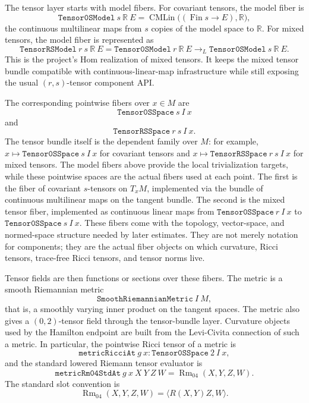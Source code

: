 \documentclass[11pt]{article}
\theoremstyle{plain}
\theoremstyle{definition}
\theoremstyle{remark}
\newcommand{\Rm}{\operatorname{Rm}}
\begin{document}
The tensor layer starts with model fibers.  For covariant tensors, the model
fiber is
\[
  \mathtt{Tensor0SModel}\ s\ \mathbb R\ E
  =
  \operatorname{CMLin}\bigl((\operatorname{Fin}s\to E),\mathbb R\bigr),
\]
the continuous multilinear maps from \(s\) copies of the model space to
\(\mathbb R\).  For mixed tensors, the model fiber is represented as
\[
  \mathtt{TensorRSModel}\ r\ s\ \mathbb R\ E
  =
  \mathtt{Tensor0SModel}\ r\ \mathbb R\ E
  \to_{\!L}
  \mathtt{Tensor0SModel}\ s\ \mathbb R\ E .
\]
This is the project's Hom realization of mixed tensors.  It keeps the mixed
tensor bundle compatible with continuous-linear-map infrastructure while still
exposing the usual \((r,s)\)-tensor component API.

The corresponding pointwise fibers over \(x\in M\) are
\[
  \mathtt{Tensor0SSpace}\ s\ I\ x
\]
and
\[
  \mathtt{TensorRSSpace}\ r\ s\ I\ x .
\]
The tensor bundle itself is the dependent family over \(M\): for example,
\(x\mapsto\mathtt{Tensor0SSpace}\ s\ I\ x\) for covariant tensors and
\(x\mapsto\mathtt{TensorRSSpace}\ r\ s\ I\ x\) for mixed tensors.  The model
fibers above provide the local trivialization targets, while these pointwise
spaces are the actual fibers used at each point.
The first is the fiber of covariant \(s\)-tensors on \(T_xM\), implemented via
the bundle of continuous multilinear maps on the tangent bundle.  The second is
the mixed tensor fiber, implemented as continuous linear maps from
\(\mathtt{Tensor0SSpace}\ r\ I\ x\) to
\(\mathtt{Tensor0SSpace}\ s\ I\ x\).  These fibers come with the topology,
vector-space, and normed-space structure needed by later estimates.  They are
not merely notation for components; they are the actual fiber objects on which
curvature, Ricci tensors, trace-free Ricci tensors, and tensor norms live.

Tensor fields are then functions or sections over these fibers.  The metric is
a smooth Riemannian metric
\[
  \mathtt{SmoothRiemannianMetric}\ I\ M,
\]
that is, a smoothly varying inner product on the tangent spaces.  The metric
also gives a \((0,2)\)-tensor field through the tensor-bundle layer.  Curvature
objects used by the Hamilton endpoint are built from the Levi-Civita connection
of such a metric.  In particular, the pointwise Ricci tensor of a metric is
\[
  \mathtt{metricRicciAt}\ g\ x
  :
  \mathtt{Tensor0SSpace}\ 2\ I\ x,
\]
and the standard lowered Riemann tensor evaluator is
\[
  \mathtt{metricRm04StdAt}\ g\ x\ X\ Y\ Z\ W
  =
  \Rm_{04}(X,Y,Z,W).
\]
The standard slot convention is
\[
  \Rm_{04}(X,Y,Z,W)=\langle R(X,Y)Z,W\rangle .
\]
\end{document}
